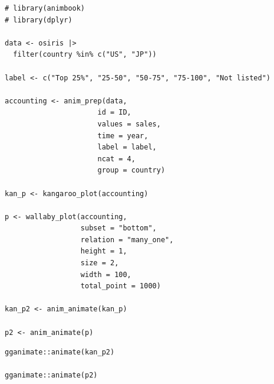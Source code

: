 \begin{verbatim}
# library(animbook)
# library(dplyr)

data <- osiris |> 
  filter(country %in% c("US", "JP"))

label <- c("Top 25%", "25-50", "50-75", "75-100", "Not listed")

accounting <- anim_prep(data, 
                      id = ID, 
                      values = sales, 
                      time = year, 
                      label = label, 
                      ncat = 4, 
                      group = country)

kan_p <- kangaroo_plot(accounting)

p <- wallaby_plot(accounting,
                  subset = "bottom",
                  relation = "many_one",
                  height = 1,
                  size = 2,
                  width = 100,
                  total_point = 1000)

kan_p2 <- anim_animate(kan_p)

p2 <- anim_animate(p)
\end{verbatim}

\begin{verbatim}
gganimate::animate(kan_p2)

gganimate::animate(p2)
\end{verbatim}

